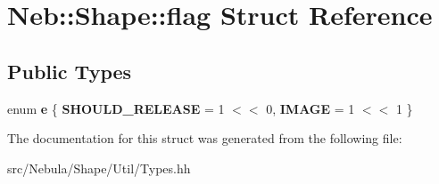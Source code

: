 \hypertarget{structNeb_1_1Shape_1_1flag}{\section{Neb\-:\-:Shape\-:\-:flag Struct Reference}
\label{structNeb_1_1Shape_1_1flag}
}
\subsection*{Public Types}
\begin{DoxyCompactItemize}
\item 
enum {\bfseries e} \{ {\bfseries S\-H\-O\-U\-L\-D\-\_\-\-R\-E\-L\-E\-A\-S\-E} = 1 $<$$<$ 0, 
{\bfseries I\-M\-A\-G\-E} = 1 $<$$<$ 1
 \}
\end{DoxyCompactItemize}


The documentation for this struct was generated from the following file\-:\begin{DoxyCompactItemize}
\item 
src/\-Nebula/\-Shape/\-Util/Types.\-hh\end{DoxyCompactItemize}

